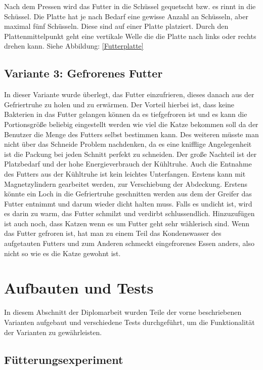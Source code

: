 Nach dem Pressen wird das Futter in die Schüssel gequetscht bzw. es rinnt in die Schüssel. Die Platte hat je nach Bedarf eine gewisse Anzahl an Schüsseln, aber maximal fünf Schüsseln. Diese sind auf einer Platte platziert. Durch den Plattenmittelpunkt geht eine vertikale Welle die die Platte nach links oder rechts drehen kann. Siehe Abbildung: \ref{Futterplatte} \\


\subsection{Variante 3: Gefrorenes Futter}

In dieser Variante wurde überlegt, das Futter einzufrieren, dieses danach aus der Gefriertruhe zu holen und zu erwärmen. Der Vorteil hierbei ist, dass keine Bakterien in das Futter gelangen können da es tiefgefroren ist und es kann die Portionsgröße beliebig eingestellt werden wie viel die Katze bekommen soll da der Benutzer die Menge des Futters selbst bestimmen kann. Des weiteren müsste man nicht über das Schneide Problem nachdenken, da es eine knifflige Angelegenheit ist die Packung bei jeden Schnitt perfekt zu schneiden. Der große Nachteil ist der Platzbedarf und der hohe Energieverbrauch der Kühltruhe. Auch die Entnahme des Futters aus der Kühltruhe ist kein leichtes Unterfangen. Erstens kann mit Magnetzylindern gearbeitet werden, zur Verschiebung der Abdeckung. Erstens könnte ein Loch in die Gefriertruhe geschnitten werden aus dem der Greifer das Futter entnimmt und darum wieder dicht halten muss. Falls es undicht ist, wird es darin zu warm, das Futter schmilzt und verdirbt schlussendlich. Hinzuzufügen ist auch noch, dass Katzen wenn es um Futter geht sehr wählerisch sind. Wenn das Futter gefroren ist, hat man zu einem  Teil das Kondenswasser des aufgetauten Futters und zum Anderen schmeckt eingefrorenes Essen anders, also nicht so wie es die Katze gewohnt ist.

\section{Aufbauten und Tests}

In diesem Abschnitt der Diplomarbeit wurden Teile der vorne beschriebenen Varianten aufgebaut und verschiedene Tests durchgeführt, um die Funktionalität der Varianten zu gewährleisten. \\

\subsection{Fütterungsexperiment} 

